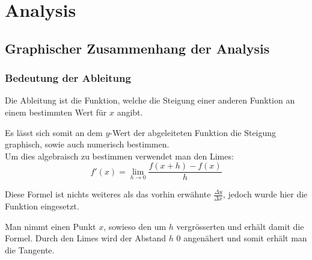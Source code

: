 \documentclass[a4paper,11pt]{report}
\begin{document}
\begin{titlepage}
    {\newUpperTitleFont\thetitle\par}
    \vspace{1cm}

    {\theauthor\par}
    \vspace{.5cm}

    {\thedate\par}
    \vspace{5cm}

\end{titlepage}
\part{Analysis}
\chapter{Graphischer Zusammenhang der Analysis}
\section{Bedeutung der Ableitung}
Die Ableitung ist die Funktion, welche die Steigung einer anderen Funktion an einem bestimmten Wert für $x$ angibt. 

Es lässt sich somit an dem $y$-Wert der abgeleiteten Funktion die Steigung graphisch, sowie auch numerisch bestimmen.\\

Um dies algebraisch zu bestimmen verwendet man den Limes:
\begin{equation}
    f'(x) = \lim_{h \to 0} \frac{f(x+h) - f(x)}{h}
\end{equation}

Diese Formel ist nichts weiteres als das vorhin erwähnte $\frac{\Delta y}{\Delta x}$, jedoch wurde hier die Funktion eingesetzt.

Man nimmt einen Punkt $x$, sowieso den um $h$ vergrösserten und erhält damit die Formel. Durch den Limes wird der Abstand $h$ 0 angenähert und somit erhält man die Tangente.
\begin{center}
\end{center}
\end{document}
